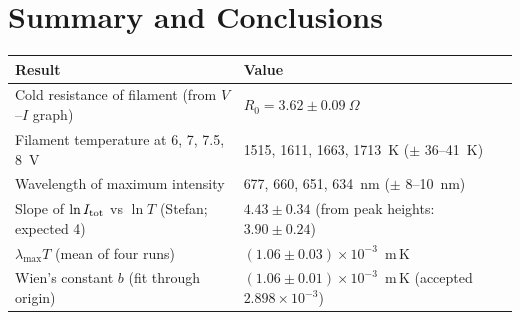\documentclass[11pt,a4paper]{article}
\begin{document}
\section{Summary and Conclusions}\label{sec:conc}
\begin{table}[H]
\centering
\begin{tabular}{p{}p{}}
\toprule
Result & Value\\
\midrule
Cold resistance of filament (from $V$--$I$ graph) & $R_0=3.62\pm0.09~\Omega$\\
Filament temperature at 6, 7, 7.5, 8~V & 1515, 1611, 1663, 1713~K ($\pm$ 36--41~K)\\
Wavelength of maximum intensity & 677, 660, 651, 634~nm ($\pm$ 8--10~nm)\\
Slope of $\ln I_{\rm tot}$ vs $\ln T$ (Stefan; expected 4) & $4.43\pm0.34$ (from peak heights: $3.90\pm0.24$)\\
$\lambda_{\max}T$ (mean of four runs) & $(1.06\pm0.03)\times10^{-3}$~m\,K\\
Wien's constant $b$ (fit through origin) & $(1.06\pm0.01)\times10^{-3}$~m\,K (accepted $2.898\times10^{-3}$)\\
\bottomrule
\end{tabular}
\end{table}
\end{document}
